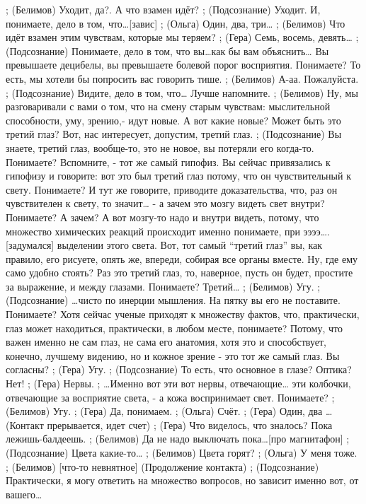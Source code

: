;	(Белимов) Уходит, да?. А что взамен идёт?
;	(Подсознание) Уходит. И, понимаете, дело в том, что…[завис]
;	(Ольга) Один, два, три…
;	(Белимов) Что идёт взамен этим чувствам, которые мы теряем?
;	(Гера) Семь, восемь, девять…
;	(Подсознание) Понимаете, дело в том, что вы…как бы вам объяснить… Вы превышаете децибелы, вы превышаете болевой порог восприятия. Понимаете? То есть, мы хотели бы попросить вас говорить тише. 
;	(Белимов) А-аа. Пожалуйста.
;	(Подсознание) Видите, дело в том, что… Лучше напомните. 
;	(Белимов) Ну, мы разговаривали с вами о том, что на смену старым чувствам: мыслительной способности, уму, зрению,- идут новые. А вот какие новые? Может быть это третий глаз? Вот, нас интересует, допустим, третий глаз.
;	(Подсознание) Вы знаете, третий глаз, вообще-то, это не новое, вы потеряли его когда-то. Понимаете? Вспомните, -  тот же самый гипофиз. Вы сейчас привязались к гипофизу и говорите: вот это был третий глаз потому, что он чувствительный к свету. Понимаете? И тут же говорите, приводите доказательства, что, раз он чувствителен к свету, то значит… - а зачем это мозгу видеть свет внутри? Понимаете? А зачем? А вот мозгу-то надо и внутри видеть, потому, что множество химических реакций происходит именно понимаете, при ээээ….[задумался] выделении этого света. Вот, тот самый ``третий глаз'' вы, как правило, его рисуете, опять же, впереди, собирая все органы вместе. Ну, где ему само удобно стоять? Раз это третий глаз, то, наверное, пусть он будет, простите за выражение, и между глазами. Понимаете? Третий…
;	(Белимов)  Угу.
;	(Подсознание) …чисто по инерции мышления. На пятку вы его не поставите. Понимаете? Хотя сейчас ученые приходят к множеству фактов, что, практически, глаз может находиться, практически, в любом месте, понимаете? Потому, что важен именно не сам глаз, не сама его анатомия, хотя это и способствует, конечно, лучшему видению, но и кожное зрение - это тот же самый глаз. Вы согласны?  
;	(Гера)  Угу.
;	(Подсознание) То есть, что основное в глазе? Оптика? Нет! 
;	(Гера)  Нервы.
;	…Именно вот эти вот нервы, отвечающие… эти колбочки, отвечающие за восприятие света, - а кожа воспринимает свет. Понимаете?
;	(Белимов) Угу.
;	(Гера)  Да, понимаем.
;	(Ольга) Счёт.
;	(Гера)  Один, два …
(Контакт прерывается, идет счет)
;	(Гера)  Что виделось, что зналось? Пока лежишь-балдеешь.
;	(Белимов) Да не надо выключать пока…[про магнитафон]
;	(Подсознание) Цвета какие-то…
;	(Белимов) Цвета горят?
;	(Ольга) У меня тоже.
;	(Белимов) [что-то невнятное]
(Продолжение контакта)
;	(Подсознание) Практически, я могу ответить на множество вопросов, но зависит именно вот, от вашего…
